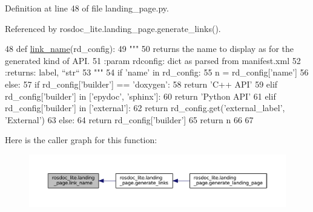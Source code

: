 Definition at line 48 of file landing\+\_\+page.\+py.



Referenced by rosdoc\+\_\+lite.\+landing\+\_\+page.\+generate\+\_\+links().


\begin{DoxyCode}
48 \textcolor{keyword}{def }\hyperlink{namespacerosdoc__lite_1_1landing__page_a36213cc50ea95b4e8ae862879455f4aa}{link\_name}(rd\_config):
49     \textcolor{stringliteral}{"""}
50 \textcolor{stringliteral}{    returns the name to display as for the generated kind of API.}
51 \textcolor{stringliteral}{    :param rdconfig: dict as parsed from manifest.xml}
52 \textcolor{stringliteral}{    :returns: label, ``str``}
53 \textcolor{stringliteral}{    """}
54     \textcolor{keywordflow}{if} \textcolor{stringliteral}{'name'} \textcolor{keywordflow}{in} rd\_config:
55         n = rd\_config[\textcolor{stringliteral}{'name'}]
56     \textcolor{keywordflow}{else}:
57         \textcolor{keywordflow}{if} rd\_config[\textcolor{stringliteral}{'builder'}] == \textcolor{stringliteral}{'doxygen'}:
58             \textcolor{keywordflow}{return} \textcolor{stringliteral}{'C++ API'}
59         \textcolor{keywordflow}{elif} rd\_config[\textcolor{stringliteral}{'builder'}] \textcolor{keywordflow}{in} [\textcolor{stringliteral}{'epydoc'}, \textcolor{stringliteral}{'sphinx'}]:
60             \textcolor{keywordflow}{return} \textcolor{stringliteral}{'Python API'}
61         \textcolor{keywordflow}{elif} rd\_config[\textcolor{stringliteral}{'builder'}] \textcolor{keywordflow}{in} [\textcolor{stringliteral}{'external'}]:
62             \textcolor{keywordflow}{return} rd\_config.get(\textcolor{stringliteral}{'external\_label'}, \textcolor{stringliteral}{'External'})
63         \textcolor{keywordflow}{else}:
64             \textcolor{keywordflow}{return} rd\_config[\textcolor{stringliteral}{'builder'}]
65     \textcolor{keywordflow}{return} n
66 
67 
\end{DoxyCode}


Here is the caller graph for this function\+:
\nopagebreak
\begin{figure}[H]
\begin{center}
\leavevmode
\includegraphics[width=350pt]{namespacerosdoc__lite_1_1landing__page_a36213cc50ea95b4e8ae862879455f4aa_icgraph}
\end{center}
\end{figure}


